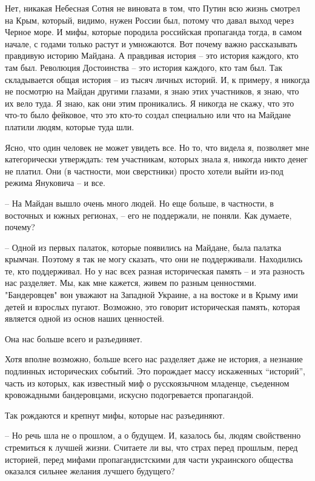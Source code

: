 Нет, никакая Небесная Сотня не виновата в том, что Путин всю жизнь смотрел на
Крым, который, видимо, нужен России был, потому что давал выход через Черное
море. И мифы, которые породила российская пропаганда тогда, в самом начале, с
годами только растут и умножаются. Вот почему важно рассказывать правдивую
историю Майдана. А правдивая история – это история каждого, кто там был.
Революция Достоинства – это история каждого, кто там был. Так складывается
общая история – из тысяч личных историй. И, к примеру, я никогда не посмотрю на
Майдан другими глазами, я знаю этих участников, я знаю, что их вело туда. Я
знаю, как они этим проникались. Я никогда не скажу, что это что-то было
фейковое, что это кто-то создал специально или что на Майдане платили людям,
которые туда шли.

Ясно, что один человек не может увидеть все. Но то, что видела я, позволяет мне
категорически утверждать: тем участникам, которых знала я, никогда никто денег
не платил. Они (в частности, мои сверстники) просто хотели выйти из-под режима
Януковича – и все.

– На Майдан вышло очень много людей. Но еще больше, в частности, в восточных и
южных регионах, – его не поддержали, не поняли. Как думаете, почему?

– Одной из первых палаток, которые появились на Майдане, была палатка крымчан.
Поэтому я так не могу сказать, что они не поддерживали. Находились те, кто
поддерживал. Но у нас всех разная историческая память – и эта разность нас
разделяет. Мы, как мне кажется, живем по разным ценностями. "Бандеровцев" вон
уважают на Западной Украине, а на востоке и в Крыму ими детей и взрослых
пугают. Возможно, это говорит историческая память, которая является одной из
основ наших ценностей.

Она нас больше всего и разъединяет.

Хотя вполне возможно, больше всего нас разделяет даже не история, а незнание
подлинных исторических событий. Это порождает массу искаженных \enquote{историй}, часть
из которых, как известный миф о русскоязычном младенце, съеденном кровожадными
бандеровцами, искусно подогревается пропагандой.

Так рождаются и крепнут мифы, которые нас разъединяют.

– Но речь шла не о прошлом, а о будущем. И, казалось бы, людям свойственно
стремиться к лучшей жизни. Считаете ли вы, что страх перед прошлым, перед
историей, перед мифами пропагандистскими для части украинского общества
оказался сильнее желания лучшего будущего?

